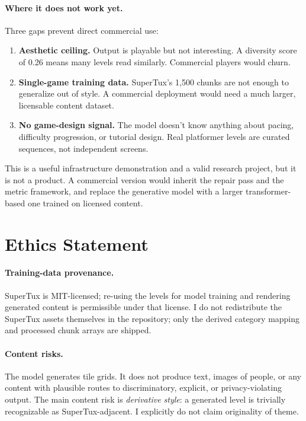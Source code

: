 \documentclass[11pt]{article}
\begin{document}
\paragraph{Where it does not work yet.} Three gaps prevent direct
commercial use:
\begin{enumerate}
    \item \textbf{Aesthetic ceiling.} Output is playable but not
    interesting. A diversity score of 0.26 means many levels read
    similarly. Commercial players would churn.
    \item \textbf{Single-game training data.} SuperTux's 1{,}500 chunks
    are not enough to generalize out of style. A commercial deployment
    would need a much larger, licensable content dataset.
    \item \textbf{No game-design signal.} The model doesn't know
    anything about pacing, difficulty progression, or tutorial
    design. Real platformer levels are curated sequences, not
    independent screens.
\end{enumerate}

This is a useful infrastructure
demonstration and a valid research project, but it is not a product.
A commercial version would inherit the repair pass and the metric
framework, and replace the generative model with a larger
transformer-based one trained on licensed content.

\section{Ethics Statement}

\paragraph{Training-data provenance.}
SuperTux is MIT-licensed; re-using the levels for model training and
rendering generated content is permissible under that license. I do
not redistribute the SuperTux assets themselves in the repository;
only the derived category mapping and processed chunk arrays are
shipped.

\paragraph{Content risks.}
The model generates tile grids. It does not produce text, images of
people, or any content with plausible routes to discriminatory,
explicit, or privacy-violating output. The main content risk is
\emph{derivative style}: a generated level is trivially
recognizable as SuperTux-adjacent. I explicitly do not claim
originality of theme.
\end{document}

